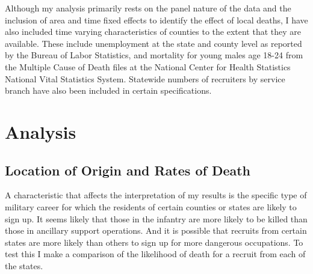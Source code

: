 \documentclass[12pt] {article}
\begin{document}
 


Although my analysis primarily rests on the panel nature of the data
and the inclusion of area and time fixed effects to identify the effect
of local deaths, I have also included time varying characteristics
of counties to the extent that they are available. These include unemployment
at the state and county level as reported by the Bureau of Labor Statistics, and mortality for young males age 18-24 from the Multiple Cause of Death files at the National Center for Health Statistics National Vital Statistics System. Statewide numbers of recruiters by service branch have also been included in certain specifications. 


\section{Analysis\label{sec:Analysis}}

\subsection{Location of Origin and Rates of Death}
A characteristic that affects the interpretation
of my results is the specific type of military career for which the
residents of certain counties or states are likely to sign up. It
seems likely that those in the infantry are more likely to be killed
than those in ancillary support operations. And it is possible that
recruits from certain states are more likely than others to sign up
for more dangerous occupations. To test this I make a comparison of the likelihood of death for a recruit from each of the states. %
\end{document}
